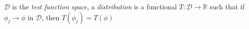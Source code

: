 \documentclass[main]{subfiles}
\begin{document}
\begin{definition}
$\mathcal D$ is the \textit{test function space}, a \textit{distribution} is a functional $T:\mathcal D\to\mathbb R$ such that if $\phi_j\to\phi$ in $\mathcal D$, then $T(\phi_j)=T(\phi)$
\end{definition}
\end{document}
